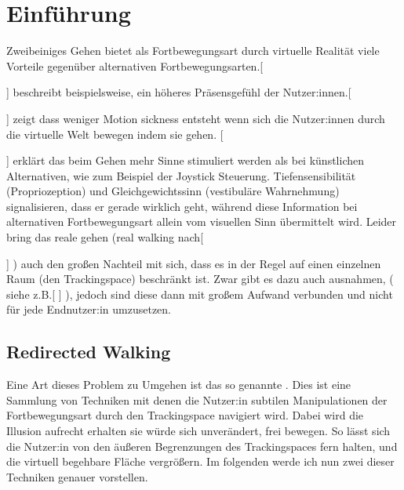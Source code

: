 
\chapter{Einführung}\label{chapter:kapitellabel}

Zweibeiniges Gehen bietet als Fortbewegungsart durch virtuelle Realität viele Vorteile gegenüber alternativen Fortbewegungsarten.[

    ]
beschreibt beispielsweise, ein höheres Präsensgefühl der Nutzer:innen.[

]
zeigt dass weniger Motion sickness entsteht wenn sich die Nutzer:innen durch die virtuelle Welt bewegen indem sie gehen.
[

]
erklärt das beim Gehen mehr Sinne stimuliert werden als bei künstlichen Alternativen, wie zum Beispiel der Joystick Steuerung. Tiefensensibilität (Propriozeption) und Gleichgewichtssinn (vestibuläre Wahrnehmung) signalisieren, dass er gerade wirklich geht, während diese Information bei alternativen Fortbewegungsart allein vom visuellen Sinn übermittelt wird.
Leider bring das reale gehen (real walking nach[

]
) auch den großen Nachteil mit sich, dass es in der Regel auf einen einzelnen Raum (den Trackingspace) beschränkt ist. Zwar gibt es dazu auch ausnahmen, ( siehe z.B.[
]
), jedoch sind diese dann mit großem Aufwand verbunden und nicht für jede Endnutzer:in umzusetzen.

\section{Redirected Walking}
Eine Art dieses Problem zu Umgehen ist das so genannte . Dies ist eine Sammlung von Techniken mit denen die Nutzer:in subtilen Manipulationen der Fortbewegungsart durch den Trackingspace navigiert wird. Dabei wird die Illusion aufrecht erhalten sie würde sich unverändert, frei bewegen. So lässt sich die Nutzer:in von den äußeren Begrenzungen des Trackingspaces fern halten, und die virtuell begehbare Fläche vergrößern.
Im folgenden werde ich nun zwei dieser Techniken genauer vorstellen.


